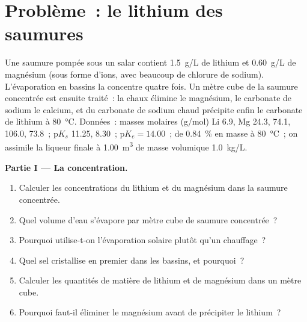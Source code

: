 \clearpage
\enlargethispage{3\baselineskip}
\section{Problème~: le lithium des saumures}

\begin{problem}
\label{pb:b1:s-block:1}
Une saumure pompée sous un salar contient \qty{1.5}{g/L} de lithium
et \qty{0.60}{g/L} de magnésium (sous forme d'ions, avec beaucoup de
chlorure de sodium). L'évaporation en bassins la concentre quatre fois.
Un mètre cube de la saumure concentrée est ensuite traité~: la chaux
élimine le magnésium, le carbonate de sodium le calcium, et du carbonate
de sodium chaud précipite enfin le carbonate de lithium à
\qty{80}{\celsius}. Données~: masses molaires (\unit{g/mol}) Li 6.9, Mg 24.3,
 74.1,  106.0,  73.8~; $\mathrm{p}K_s$
 11.25,  8.30~; $\mathrm{p}K_e = 14.00$~;
 de  \qty{0.84}{\percent} en masse à
\qty{80}{\celsius}~; on assimile la liqueur finale à \qty{1.00}{m^3} de
masse volumique \qty{1.0}{kg/L}.

\medskip
\noindent\textbf{Partie I --- La concentration.}
\begin{enumerate}
  \item Calculer les concentrations du lithium et du magnésium dans la
        saumure concentrée.
  \item Quel volume d'eau s'évapore par mètre cube de saumure
        concentrée~?
  \item Pourquoi utilise-t-on l'évaporation solaire plutôt qu'un
        chauffage~?
  \item Quel sel cristallise en premier dans les bassins, et pourquoi~?
  \item Calculer les quantités de matière de lithium et de magnésium dans
        un mètre cube.
  \item Pourquoi faut-il éliminer le magnésium avant de précipiter le
        lithium~?
\end{enumerate}


\end{problem}
